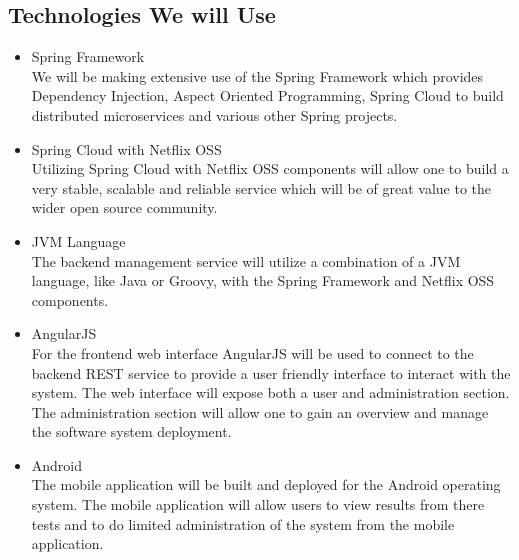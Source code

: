 \subsection{Technologies We will Use}
\begin{itemize}
	\item Spring Framework \\
		We will be making extensive use of the Spring Framework which provides Dependency Injection, Aspect Oriented Programming, Spring Cloud to build distributed microservices and various other Spring projects.
	\item Spring Cloud with Netflix OSS \\
		Utilizing Spring Cloud with Netflix OSS components will allow one to build a very stable, scalable and reliable service which will be of great value to the wider open source community.
	\item JVM Language \\
		The backend management service will utilize a combination of a JVM language, like Java or Groovy, with the Spring Framework and Netflix OSS components.
	\item AngularJS \\
		For the frontend web interface AngularJS will be used to connect to the backend REST service to provide a user friendly interface to interact with the system. The web interface will expose both a user and administration section. The administration section will allow one to gain an overview and manage the software system deployment.
	\item Android \\
		The mobile application will be built and deployed for the Android operating system. The mobile application will allow users to view results from there tests and to do limited administration of the system from the mobile application.
	\end{itemize}

